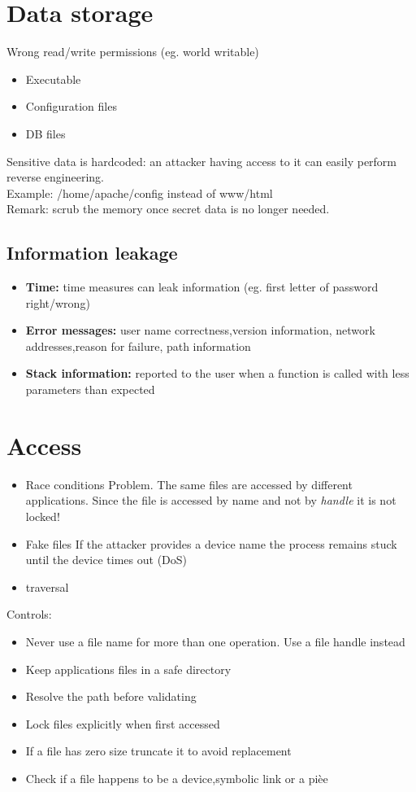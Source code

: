 \documentclass[10pt,a4paper]{book}
\begin{document}
\section{Data storage}
Wrong read/write permissions (eg. world writable)
\begin{itemize}
\item Executable
\item Configuration files
\item DB files
\end{itemize}
Sensitive data is hardcoded: an attacker having access to it can easily perform reverse engineering.\\
Example: /home/apache/config instead of www/html\\
Remark: scrub the memory once secret data is no longer needed.
\subsection{Information leakage}
\begin{itemize}
\item \textbf{Time:} time measures can leak information (eg. first letter of password right/wrong)
\item \textbf{Error messages:} user name correctness,version information, network addresses,reason for failure, path information
\item \textbf{Stack information:} reported to the user when a function is called with less parameters than expected
\end{itemize}
\section{Access}
\begin{itemize}
\item Race conditions
Problem. The same files are accessed by different applications. Since the file is accessed by name and not by \emph{handle} it is not locked!
\item Fake files
If the attacker provides a device name the process remains stuck until the device times out (DoS)
\item traversal
\end{itemize}
Controls:
\begin{itemize}
\item Never use a file name for more than one operation. Use a file handle instead
\item Keep applications files in a safe directory
\item Resolve the path before validating
\item Lock files explicitly when first accessed
\item If a file has zero size truncate it to avoid replacement
\item Check if a file happens to be a device,symbolic link or a pièe
\end{itemize}
\end{document}
